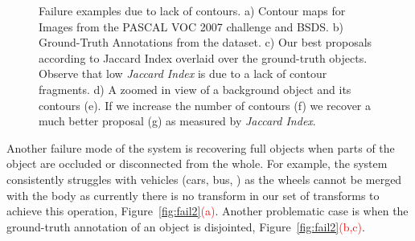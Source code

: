 \begin{figure}[!ht]



\caption{Failure examples due to lack of contours. a) Contour maps for Images from the PASCAL VOC 2007 challenge and BSDS. b) Ground-Truth Annotations from the dataset. c) Our best proposals according to Jaccard Index overlaid over the ground-truth objects. Observe that low \emph{Jaccard Index} is due to a lack of contour fragments. d) A zoomed in view of a background object and its contours (e). If we increase the number of contours (f) we recover a much better proposal (g) as measured by \emph{Jaccard Index}. }
 \label{fig:fail1}
 \end{figure}

Another failure mode of the system is recovering full objects when parts of the object are occluded or disconnected from the whole. For example, the system consistently struggles with vehicles (cars, bus, \etc) as the wheels cannot be merged with the body as currently there is no transform in our set of transforms to achieve this operation, Figure~\ref{fig:fail2}\textcolor{red}{(a)}. Another problematic case is when the ground-truth annotation of an object is disjointed, Figure~\ref{fig:fail2}\textcolor{red}{(b,c)}. 



